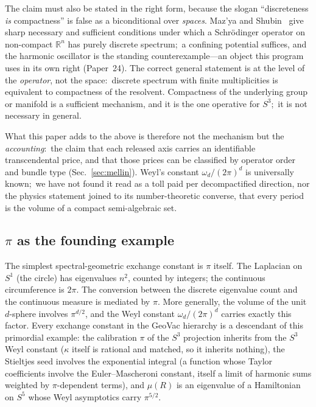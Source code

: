 \documentclass[aps,pra,twocolumn,superscriptaddress,longbibliography]{revtex4-2}
\begin{document}
The claim must also be stated in the right form, because the slogan
``discreteness \emph{is} compactness'' is false as a biconditional over
\emph{spaces}.  Maz'ya and Shubin~\cite{mazya_shubin2005} give sharp
necessary and sufficient conditions under which a Schr\"odinger operator on
non-compact $\mathbb{R}^n$ has purely discrete spectrum;\ a confining
potential suffices, and the harmonic oscillator is the standing
counterexample---an object this program uses in its own right
(Paper~24).  The correct general statement is at the level of the
\emph{operator}, not the space:\ discrete spectrum with finite
multiplicities is equivalent to compactness of the resolvent.  Compactness
of the underlying group or manifold is a sufficient mechanism, and it is
the one operative for $S^3$;\ it is not necessary in general.

What this paper adds to the above is therefore not the mechanism but the
\emph{accounting}:\ the claim that each released axis carries an
identifiable transcendental price, and that those prices can be classified
by operator order and bundle type (Sec.~\ref{sec:mellin}).  Weyl's constant
$\omega_d/(2\pi)^d$ is universally known;\ we have not found it read as a
toll paid per decompactified direction, nor the physics statement joined to
its number-theoretic converse, that every period is the volume of a compact
semi-algebraic set.

\subsection{$\pi$ as the founding example}

The simplest spectral-geometric exchange constant is $\pi$ itself.
The Laplacian on $S^1$ (the circle) has eigenvalues $n^2$, counted
by integers; the continuous circumference is $2\pi$.  The
conversion between the discrete eigenvalue count and the continuous
measure is mediated by $\pi$.  More generally, the volume of the
unit $d$-sphere involves $\pi^{d/2}$, and the Weyl constant
$\omega_d / (2\pi)^d$ carries exactly this factor.  Every exchange
constant in the GeoVac hierarchy is a descendant of this primordial
example: the calibration $\pi$ of the $S^3$ projection inherits from
the $S^3$ Weyl constant ($\kappa$ itself is rational and matched, so it
inherits nothing), the
Stieltjes seed involves the exponential integral (a function whose
Taylor coefficients involve the Euler--Mascheroni constant, itself
a limit of harmonic sums weighted by $\pi$-dependent terms), and
$\mu(R)$ is an eigenvalue of a Hamiltonian on $S^5$ whose Weyl
asymptotics carry $\pi^{5/2}$.
\end{document}
